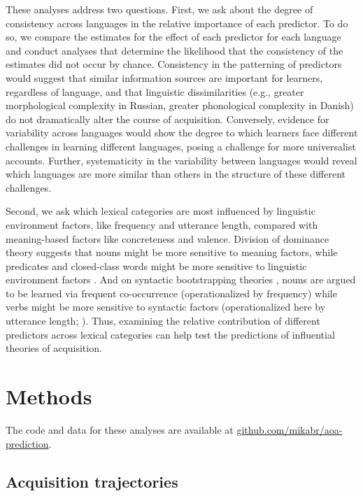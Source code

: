 \documentclass[manuscript]{stjour}
\begin{document}
These analyses address two questions. First, we ask about the degree of
consistency across languages in the relative importance of each
predictor. To do so, we compare the estimates for the effect of each
predictor for each language and conduct analyses that determine the
likelihood that the consistency of the estimates did not occur by
chance. Consistency in the patterning of predictors would suggest that
similar information sources are important for learners, regardless of
language, and that linguistic dissimilarities (e.g., greater
morphological complexity in Russian, greater phonological complexity in
Danish) do not dramatically alter the course of acquisition. Conversely,
evidence for variability across languages would show the degree to which
learners face different challenges in learning different languages,
posing a challenge for more universalist accounts. Further,
systematicity in the variability between languages would reveal which
languages are more similar than others in the structure of these
different challenges.

Second, we ask which lexical categories are most influenced by
linguistic environment factors, like frequency and utterance length,
compared with meaning-based factors like concreteness and valence.
Division of dominance theory suggests that nouns might be more sensitive
to meaning factors, while predicates and closed-class words might be
more sensitive to linguistic environment factors \citep{gentner2001}.
And on syntactic bootstrapping theories \citep{gleitman1990}, nouns are
argued to be learned via frequent co-occurrence (operationalized by
frequency) while verbs might be more sensitive to syntactic factors
(operationalized here by utterance length; \citep{snedeker2007}). Thus,
examining the relative contribution of different predictors across
lexical categories can help test the predictions of influential theories
of acquisition.

\section{Methods}

The code and data for these analyses are available at
\href{https://github.com/mikabr/aoa-prediction}{github.com/mikabr/aoa-prediction}.

\subsection{Acquisition trajectories}
\end{document}
